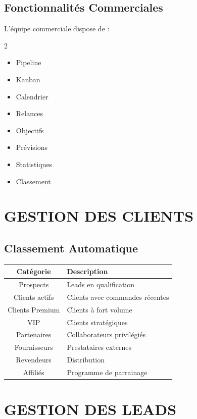 \documentclass[12pt,a4paper,oneside]{book}
\begin{document}
\section{Fonctionnalités Commerciales}
L'équipe commerciale dispose de :
\begin{multicols}{2}
\begin{itemize}
\item Pipeline
\item Kanban
\item Calendrier
\item Relances
\item Objectifs
\item Prévisions
\item Statistiques
\item Classement
\end{itemize}
\end{multicols}

\chapter{GESTION DES CLIENTS}

\section{Classement Automatique}
\begin{center}
\begin{tabular}{|c|p{10cm}|}
\hline
\rowcolor{electronblue}
\color{white}\textbf{Catégorie} & \color{white}\textbf{Description} \\
\hline
Prospects & Leads en qualification \\
\hline
Clients actifs & Clients avec commandes récentes \\
\hline
Clients Premium & Clients à fort volume \\
\hline
VIP & Clients stratégiques \\
\hline
Partenaires & Collaborateurs privilégiés \\
\hline
Fournisseurs & Prestataires externes \\
\hline
Revendeurs & Distribution \\
\hline
Affiliés & Programme de parrainage \\
\hline
\end{tabular}
\end{center}

\chapter{GESTION DES LEADS}
\end{document}
